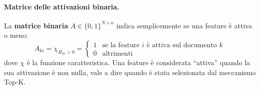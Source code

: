 \paragraph{Matrice delle attivazioni binaria.} La \textbf{matrice binaria} $A \in \{0,1\}^{N \times n}$ indica semplicemente se una feature è attiva o meno:
\begin{equation}
    A_{ki} = \chi_{H_{ki} > 0} = 
    \begin{cases}
        1 & \text{se la feature } i \text{ è attiva sul documento } k \\
        0 & \text{altrimenti}
    \end{cases}
    \label{eq:binary_activation}
\end{equation}
dove $\chi$ è la funzione caratteristica. Una feature è considerata ``attiva'' quando la sua attivazione è non nulla, vale a dire quando è stata selezionata dal meccanismo Top-K.
